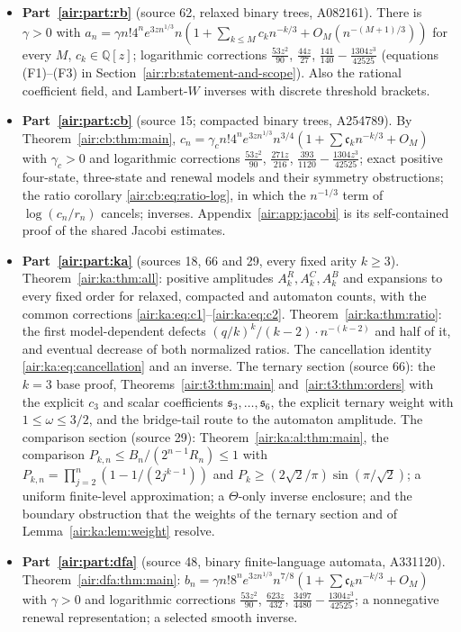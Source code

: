 \documentclass[11pt,letterpaper]{article}
\numberwithin{equation}{section}
\theoremstyle{remark}
\newcommand{\Q}{\mathbb{Q}}
\begin{document}
\begin{itemize}
\item \textbf{Part~\ref{air:part:rb}} (source 62, relaxed binary trees, A082161). There is $\gamma>0$ with $a_n=\gamma n!4^ne^{3zn^{1/3}}n(1+\sum_{k\le M}c_kn^{-k/3}+O_M(n^{-(M+1)/3}))$ for every $M$, $c_k\in\Q[z]$; logarithmic corrections $\frac{53z^2}{90}$, $\frac{44z}{27}$, $\frac{141}{140}-\frac{1304z^3}{42525}$ (equations (F1)--(F3) in Section~\ref{air:rb:statement-and-scope}). Also the rational coefficient field, and Lambert-$W$ inverses with discrete threshold brackets.
\item \textbf{Part~\ref{air:part:cb}} (source 15; compacted binary trees, A254789). By Theorem~\ref{air:cb:thm:main}, $c_n=\gamma_cn!4^ne^{3zn^{1/3}}n^{3/4}(1+\sum\mathfrak c_kn^{-k/3}+O_M)$ with $\gamma_c>0$ and logarithmic corrections $\frac{53z^2}{90}$, $\frac{271z}{216}$, $\frac{393}{1120}-\frac{1304z^3}{42525}$; exact positive four-state, three-state and renewal models and their symmetry obstructions; the ratio corollary \eqref{air:cb:eq:ratio-log}, in which the $n^{-1/3}$ term of $\log(c_n/r_n)$ cancels; inverses. Appendix~\ref{air:app:jacobi} is its self-contained proof of the shared Jacobi estimates.
\item \textbf{Part~\ref{air:part:ka}} (sources 18, 66 and 29, every fixed arity $k\ge3$). Theorem~\ref{air:ka:thm:all}: positive amplitudes $A_k^R,A_k^C,A_k^B$ and expansions to every fixed order for relaxed, compacted and automaton counts, with the common corrections \eqref{air:ka:eq:c1}--\eqref{air:ka:eq:c2}. Theorem~\ref{air:ka:thm:ratio}: the first model-dependent defects $(q/k)^k/(k-2)\cdot n^{-(k-2)}$ and half of it, and eventual decrease of both normalized ratios. The cancellation identity \eqref{air:ka:eq:cancellation} and an inverse. The ternary section (source 66): the $k=3$ base proof, Theorems~\ref{air:t3:thm:main} and~\ref{air:t3:thm:orders} with the explicit $c_3$ and scalar coefficients $\mathfrak s_3,\ldots,\mathfrak s_6$, the explicit ternary weight with $1\le\omega\le3/2$, and the bridge-tail route to the automaton amplitude. The comparison section (source 29): Theorem~\ref{air:ka:al:thm:main}, the comparison $P_{k,n}\le B_n/(2^{n-1}R_n)\le1$ with $P_{k,n}=\prod_{j=2}^n(1-1/(2j^{k-1}))$ and $P_k\ge(2\sqrt2/\pi)\sin(\pi/\sqrt2)$; a uniform finite-level approximation; a $\Theta$-only inverse enclosure; and the boundary obstruction that the weights of the ternary section and of Lemma~\ref{air:ka:lem:weight} resolve.
\item \textbf{Part~\ref{air:part:dfa}} (source 48, binary finite-language automata, A331120). Theorem~\ref{air:dfa:thm:main}: $b_n=\gamma n!8^ne^{3zn^{1/3}}n^{7/8}(1+\sum\mathfrak c_kn^{-k/3}+O_M)$ with $\gamma>0$ and logarithmic corrections $\frac{53z^2}{90}$, $\frac{623z}{432}$, $\frac{3497}{4480}-\frac{1304z^3}{42525}$; a nonnegative renewal representation; a selected smooth inverse.
\end{itemize}
\end{document}
